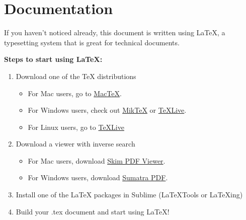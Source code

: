 \documentclass{article}
\begin{document}
\section{Documentation}
If you haven't noticed already, this document is written using \LaTeX, a typesetting system that is great for technical documents.
\begin{flushleft}
  \textbf{Steps to start using \LaTeX:}
  \begin{enumerate}
    \item Download one of the TeX distributions
    \begin{itemize}
      \item For Mac users, go to \href {http://www.tug.org/mactex/}{MacTeX}.
      \item For Windows users, check out \href{https://miktex.org/}{MikTeX} or \href{https://www.tug.org/texlive/}{TeXLive}.
      \item For Linux users, go to \href{https://www.tug.org/texlive/}{TeXLive}
    \end{itemize}
    \item Download a viewer with inverse search
    \begin{itemize}
      \item For Mac users, download \href {http://skim-app.sourceforge.net/}{Skim PDF Viewer}.
      \item For Windows users, download \href {https://www.sumatrapdfreader.org/free-pdf-reader.html}{Sumatra PDF}.
    \end{itemize}
    \item Install one of the LaTeX packages in Sublime (LaTeXTools or LaTeXing)
    \item Build your .tex document and start using \LaTeX!
  \end{enumerate}
\end{flushleft}

\end{document}
